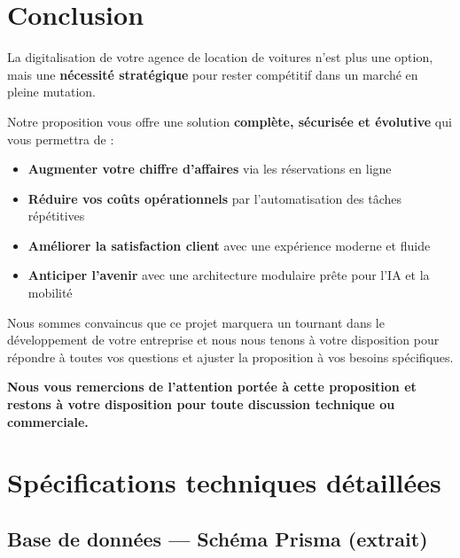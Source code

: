 \documentclass[12pt, a4paper]{article}
\begin{document}
\section{Conclusion}

\vspace{0.5cm}
\noindent La digitalisation de votre agence de location de voitures n'est plus une option, mais une \textbf{nécessité stratégique} pour rester compétitif dans un marché en pleine mutation.

Notre proposition vous offre une solution \textbf{complète, sécurisée et évolutive} qui vous permettra de :
\begin{itemize}[leftmargin=*,noitemsep]
  \item \textbf{Augmenter votre chiffre d'affaires} via les réservations en ligne
  \item \textbf{Réduire vos coûts opérationnels} par l'automatisation des tâches répétitives
  \item \textbf{Améliorer la satisfaction client} avec une expérience moderne et fluide
  \item \textbf{Anticiper l'avenir} avec une architecture modulaire prête pour l'IA et la mobilité
\end{itemize}

Nous sommes convaincus que ce projet marquera un tournant dans le développement de votre entreprise et nous nous tenons à votre disposition pour répondre à toutes vos questions et ajuster la proposition à vos besoins spécifiques.

\vspace{1.5cm}
\noindent\textbf{Nous vous remercions de l'attention portée à cette proposition et restons à votre disposition pour toute discussion technique ou commerciale.}

\appendix
\section{Spécifications techniques détaillées}
\subsection{Base de données — Schéma Prisma (extrait)}
\end{document}
